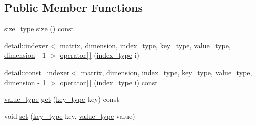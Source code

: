 \subsection*{Public Member Functions}
\begin{DoxyCompactItemize}
\item 
\hyperlink{structmatrix_1_1matrix_aebc6efd587a1c3f0a951631d6ee6837f}{size\+\_\+type} \hyperlink{structmatrix_1_1matrix_a56f1554d0f871ac5e2b3dac89d26113e}{size} () const
\item 
\hyperlink{structmatrix_1_1detail_1_1indexer}{detail\+::indexer}$<$ \hyperlink{structmatrix_1_1matrix}{matrix}, \hyperlink{structmatrix_1_1matrix_a7d76bd51fd998974f59ea4035e053f74}{dimension}, \hyperlink{structmatrix_1_1matrix_a87b61e7f35dcd5991cd3f243cfeced06}{index\+\_\+type}, \hyperlink{structmatrix_1_1matrix_af7b5498ac1b615cb9ef51bd185a2557e}{key\+\_\+type}, \hyperlink{structmatrix_1_1matrix_ab940e7a84942339cdee7c0f0d3bd8ef9}{value\+\_\+type}, \hyperlink{structmatrix_1_1matrix_a7d76bd51fd998974f59ea4035e053f74}{dimension} -\/ 1 $>$ \hyperlink{structmatrix_1_1matrix_a06d5b697d7f64430305967f4adc80633}{operator\mbox{[}$\,$\mbox{]}} (\hyperlink{structmatrix_1_1matrix_a87b61e7f35dcd5991cd3f243cfeced06}{index\+\_\+type} i)
\item 
\hyperlink{structmatrix_1_1detail_1_1const__indexer}{detail\+::const\+\_\+indexer}$<$ \hyperlink{structmatrix_1_1matrix}{matrix}, \hyperlink{structmatrix_1_1matrix_a7d76bd51fd998974f59ea4035e053f74}{dimension}, \hyperlink{structmatrix_1_1matrix_a87b61e7f35dcd5991cd3f243cfeced06}{index\+\_\+type}, \hyperlink{structmatrix_1_1matrix_af7b5498ac1b615cb9ef51bd185a2557e}{key\+\_\+type}, \hyperlink{structmatrix_1_1matrix_ab940e7a84942339cdee7c0f0d3bd8ef9}{value\+\_\+type}, \hyperlink{structmatrix_1_1matrix_a7d76bd51fd998974f59ea4035e053f74}{dimension} -\/ 1 $>$ \hyperlink{structmatrix_1_1matrix_a05ed849b55f74a145d2c5e3a3ba80431}{operator\mbox{[}$\,$\mbox{]}} (\hyperlink{structmatrix_1_1matrix_a87b61e7f35dcd5991cd3f243cfeced06}{index\+\_\+type} i) const
\item 
\hyperlink{structmatrix_1_1matrix_ab940e7a84942339cdee7c0f0d3bd8ef9}{value\+\_\+type} \hyperlink{structmatrix_1_1matrix_a312aeb3131a45703593dd29558dc54da}{get} (\hyperlink{structmatrix_1_1matrix_af7b5498ac1b615cb9ef51bd185a2557e}{key\+\_\+type} key) const
\item 
void \hyperlink{structmatrix_1_1matrix_aec0384fc656feed77a2c71c2ed0065d8}{set} (\hyperlink{structmatrix_1_1matrix_af7b5498ac1b615cb9ef51bd185a2557e}{key\+\_\+type} key, \hyperlink{structmatrix_1_1matrix_ab940e7a84942339cdee7c0f0d3bd8ef9}{value\+\_\+type} value)

\end{DoxyCompactItemize}
